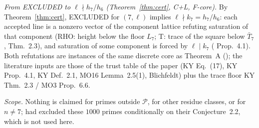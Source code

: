 \emph{From EXCLUDED to $\ell\nmid h_7/h_6$ (Theorem~\ref{thm:cert}, C+L, F-core).} By Theorem~\ref{thm:cert}, EXCLUDED for $(7,\ell)$ implies $\ell\nmid k_7=h_7/h_6$: each accepted line is a nonzero vector of the component lattice refuting saturation of that component (RHO: height below the floor $L_7$; T: trace of the square below $\bar T_7$, \cite{KY} Thm.~2.3), and saturation of some component is forced by $\ell\mid k_7$ (\cite{KY} Prop.~4.1). Both refutations are instances of the same discrete core as Theorem~A (); the literature inputs are those of the trust table of the paper (KY Eq.~(17), KY Prop.~4.1, KY Def.~2.1, MO16 Lemma~2.5(1), Blichfeldt) plus the trace floor KY Thm.~2.3 / MO3 Prop.~6.6.

\emph{Scope.} Nothing is claimed for primes outside $\mathcal P$, for other residue classes, or for $n\ne7$; \cite{KY} had excluded these $1000$ primes conditionally on their Conjecture~2.2, which is not used here.
